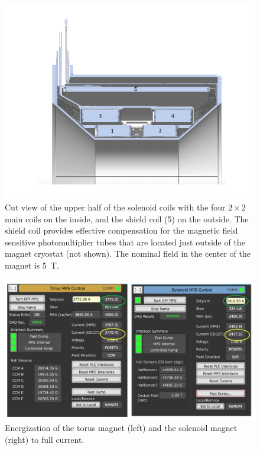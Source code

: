 \documentclass[final,3p]{elsarticle}
\begin{document}
\begin{twocolumn}
\begin{figure}[th!]
\centerline{\includegraphics[width=1.0\columnwidth]{Solenoid.pdf}}
\caption{Cut view of the upper half of the solenoid coils with the four $2 \times 2$ main coils on the inside, and the
  shield coil (5) on the outside. The shield coil provides effective compensation for the magnetic field sensitive
  photomultiplier tubes that are located just outside of the magnet cryostat (not shown). The nominal field in the
  center of the magnet is 5~T.}
\label{solenoid-coils}
\end{figure}

\begin{figure}[h!]
\centerline{\includegraphics[width=1.8\columnwidth]{Magnets-currents.png}}
\caption{Energization of the torus magnet (left) and the solenoid magnet (right) to full current.}
\label{Magnet-currents1}
\end{figure}


\end{twocolumn}
\end{document}
